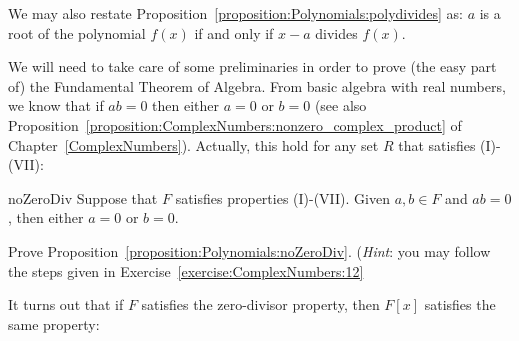We may also restate Proposition~\ref{proposition:Polynomials:polydivides} as:  $a$ is a root of the polynomial $f(x)$ if and only if $x-a$ divides $f(x)$.

We will need to take care of some preliminaries in order to prove (the easy part of) the Fundamental Theorem of Algebra. From basic algebra with real numbers, we know that if $ab=0$ then either $a=0$ or $b=0$ (see also 
Proposition~\ref{proposition:ComplexNumbers:nonzero_complex_product} of Chapter~\ref{ComplexNumbers}). Actually, this  hold for any set $R$ that satisfies (I)-(VII):

\begin{prop}{noZeroDiv} Suppose that $F$ satisfies properties (I)-(VII). Given $a,b \in F$ and $ab = 0$, then either $a=0$ or $b=0$. 
\end{prop}

\begin{exercise}{}
Prove Proposition~\ref{proposition:Polynomials:noZeroDiv}.  (\emph{Hint}: you may follow the steps given in Exercise~\ref{exercise:ComplexNumbers:12} 
\end{exercise}

It turns out that if $F$ satisfies the zero-divisor property, then $F[x]$ satisfies the same property:

